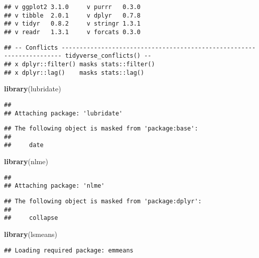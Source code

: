 \documentclass[]{article}
\newenvironment{Shaded}{\begin{snugshade}}{\end{snugshade}}
\newcommand{\KeywordTok}[1]{\textcolor[rgb]{0.13,0.29,0.53}{\textbf{#1}}}
\newcommand{\NormalTok}[1]{#1}
\begin{document}
\begin{verbatim}
## v ggplot2 3.1.0     v purrr   0.3.0
## v tibble  2.0.1     v dplyr   0.7.8
## v tidyr   0.8.2     v stringr 1.3.1
## v readr   1.3.1     v forcats 0.3.0
\end{verbatim}

\begin{verbatim}
## -- Conflicts ---------------------------------------------------------------------- tidyverse_conflicts() --
## x dplyr::filter() masks stats::filter()
## x dplyr::lag()    masks stats::lag()
\end{verbatim}

\begin{Shaded}
\begin{Highlighting}[]
\KeywordTok{library}\NormalTok{(lubridate)}
\end{Highlighting}
\end{Shaded}

\begin{verbatim}
## 
## Attaching package: 'lubridate'
\end{verbatim}

\begin{verbatim}
## The following object is masked from 'package:base':
## 
##     date
\end{verbatim}

\begin{Shaded}
\begin{Highlighting}[]
\KeywordTok{library}\NormalTok{(nlme)}
\end{Highlighting}
\end{Shaded}

\begin{verbatim}
## 
## Attaching package: 'nlme'
\end{verbatim}

\begin{verbatim}
## The following object is masked from 'package:dplyr':
## 
##     collapse
\end{verbatim}

\begin{Shaded}
\begin{Highlighting}[]
\KeywordTok{library}\NormalTok{(lsmeans)}
\end{Highlighting}
\end{Shaded}

\begin{verbatim}
## Loading required package: emmeans
\end{verbatim}
\end{document}
